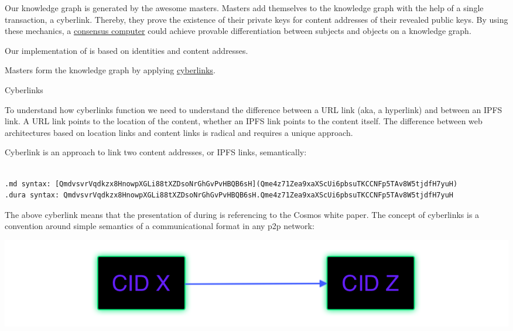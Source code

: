 \documentclass[8pt,oneside]{amsart}
\makeatletter
\newcommand{\linkred}[2]{\href{#1}{\color{red}{#2}}}
\renewcommand\subsection{\@startsection{subsection}
                                    {2}{\z@}
                                    {-3.25ex\@plus -1ex \@minus -.2ex}
                                    {0ex \@plus .2ex}
                                    {\play\Large}
                        }
\newcommand{\titleSection}[1]{\subsection{#1}}
\newenvironment{Figure}
  {\par\medskip\noindent\minipage{\linewidth}}
  {\endminipage\par\medskip}
\makeatother
\begin{document}
Our knowledge graph is generated by the awesome masters. Masters add themselves to the knowledge graph with the help of a single transaction, a cyberlink. Thereby, they prove the existence of their private keys for content addresses of their revealed public keys. By using these mechanics, a {\hyperref[consensus-computer]{consensus computer}} could achieve provable differentiation between subjects and objects on a knowledge graph.

Our implementation of \linkred{https://github.com/cybercongress/go-cyber}{go-cyber} is based on \linkred{https://github.com/cosmos/cosmos-sdk}{cosmos-SDK} identities and \linkred{https://github.com/multiformats/cid#cidv0}{CIDv0/CIDv1} content addresses.

Masters form the knowledge graph by applying {\hyperref[cyberlinks]{cyberlinks}}.

\titleSection{Cyberlinks}\label{cyberlinks}

To understand how cyberlinks function we need to understand the difference between a URL link (aka, a hyperlink) and between an IPFS link. A URL link points to the location of the content, whether an IPFS link points to the content itself. The difference between web architectures based on location links and content links is radical and requires a unique approach.

Cyberlink is an approach to link two content addresses, or IPFS links, semantically:

\begin{lstlisting}

.md syntax: [QmdvsvrVqdkzx8HnowpXGLi88tXZDsoNrGhGvPvHBQB6sH](Qme4z71Zea9xaXScUi6pbsuTKCCNFp5TAv8W5tjdfH7yuH)
.dura syntax: QmdvsvrVqdkzx8HnowpXGLi88tXZDsoNrGhGvPvHBQB6sH.Qme4z71Zea9xaXScUi6pbsuTKCCNFp5TAv8W5tjdfH7yuH
\end{lstlisting}

The above cyberlink means that the presentation of \linkred{https://github.com/cybercongress/go-cyber}{go-cyber} during \linkred{https://etherscan.io/token/0x61B81103e716B611Fff8aF5A5Dc8f37C628efb1E}{cyberc0n} is referencing to the Cosmos white paper. The concept of cyberlinks is a convention around simple semantics of a communicational format in any p2p network:

\begin{Figure}
    \centering
    \includegraphics[width=1\textwidth]{cyberlink.png}
\end{Figure}
\end{document}
